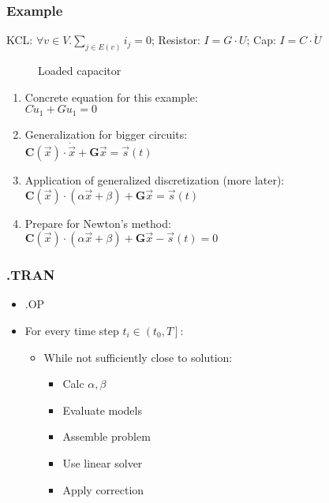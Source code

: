 \begin{frame}
\frametitle{Example}
KCL: \(\forall v \in V. \sum_{j \in E(v)} i_{j} = 0\); Resistor: \(I = G \cdot U\); Cap: \(I = C \cdot \dot{U}\)
\begin{figure}[ht]
    \centering
        \begin{circuitikz}
            
        \end{circuitikz}
    \caption{Loaded capacitor}
\label{fig:cap}
\end{figure}
\pause
\begin{enumerate}[<+->]
    \item Concrete equation for this example:\\
        \(C\dot{u}_1 + Gu_1 = 0\)
    \item Generalization for bigger circuits:\\
        \(\mathbf{C}(\vec{x}) \cdot \dot{\vec{x}} + \mathbf{G} \vec{x} = \vec{s}(t)\)
    \item Application of generalized discretization (more later):\\
        \(\mathbf{C}(\vec{x}) \cdot (\alpha \vec{x} + \beta) + \mathbf{G} \vec{x} = \vec{s}(t)\)
    \item Prepare for Newton's method:\\
        \(\mathbf{C}(\vec{x}) \cdot (\alpha \vec{x} + \beta) + \mathbf{G} \vec{x} - \vec{s}(t)= 0\)
\end{enumerate}
\end{frame}

\begin{frame}
\frametitle{.TRAN}
\begin{itemize}
    \item .OP
    \item For every time step \(t_i \in \left(t_0, T\right]\):
    \begin{itemize}
        \item While not sufficiently close to solution:
        \begin{itemize}
            \item Calc \(\alpha, \beta\)
            \item Evaluate models
            \item Assemble problem
            \item Use linear solver
            \item Apply correction
        \end{itemize}
    \end{itemize}
\end{itemize}
\end{frame}


